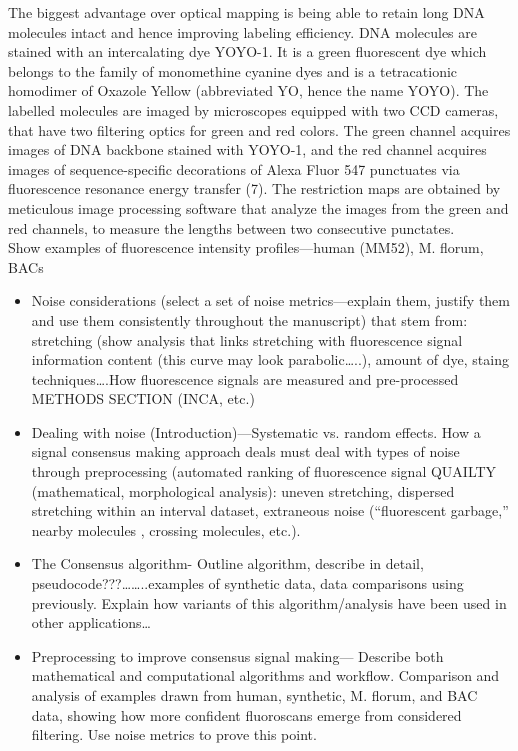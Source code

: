 The biggest advantage over optical mapping is being able to retain long DNA molecules intact and hence improving labeling efficiency. DNA molecules are stained with an intercalating dye YOYO-1. It is a green fluorescent dye which belongs to the family of monomethine cyanine dyes and is a tetracationic homodimer of Oxazole Yellow (abbreviated YO, hence the name YOYO). The labelled molecules are imaged by microscopes equipped with two CCD cameras, that have two filtering optics for green and red colors. The green channel acquires images of DNA backbone stained with YOYO-1, and the red channel acquires images of sequence-specific decorations of Alexa Fluor 547 punctuates via fluorescence resonance energy transfer (7). The restriction maps are obtained by meticulous image processing software that analyze the images from the green and red channels, to measure the lengths between two consecutive punctates.  \\



Show examples of fluorescence intensity profiles—human (MM52), M. florum,  BACs
\begin{itemize}
\item Noise considerations (select a set of noise metrics—explain them, justify them and use them consistently throughout the manuscript) that stem from: stretching (show analysis that links stretching with fluorescence signal information content (this curve may look parabolic…..), amount of dye, staing techniques….How fluorescence signals are measured and pre-processed METHODS SECTION (INCA, etc.)
\item Dealing with noise (Introduction)—Systematic vs. random effects. How a signal consensus making approach deals must deal with types of noise through preprocessing (automated ranking of fluorescence signal QUAILTY (mathematical, morphological analysis): uneven stretching, dispersed stretching within an interval dataset, extraneous noise (“fluorescent garbage,” nearby molecules , crossing molecules, etc.). 
\item The Consensus algorithm- Outline algorithm, describe in detail, pseudocode???……..examples of synthetic data, data comparisons using previously. Explain how variants of this algorithm/analysis have been used in other applications…
\item Preprocessing to improve consensus signal making— Describe both mathematical and computational algorithms and workflow. Comparison and analysis of examples drawn from human, synthetic, M. florum, and BAC data, showing how more confident fluoroscans emerge from considered filtering. Use noise metrics to prove this point.
\end{itemize}


